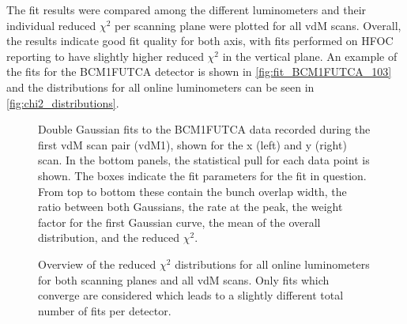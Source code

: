 The fit results were compared among the different luminometers and their individual reduced $\chi^2$ per scanning plane were plotted for all vdM scans. Overall, the results indicate good fit quality for both axis, with fits performed on HFOC reporting to have slightly higher reduced $\chi^2$ in the vertical plane. An example of the fits for the BCM1FUTCA detector is shown in \autoref{fig:fit_BCM1FUTCA_103} and the distributions for all online luminometers can be seen in \autoref{fig:chi2_distributions}.

\begin{figure}[!htb]
	\centering
	\caption[Double Gaussian fits for BCM1FUTCA]{Double Gaussian fits to the BCM1FUTCA data recorded during the first vdM scan pair (vdM1), shown for the x (left) and y (right) scan. In the bottom panels, the statistical pull for each data point is shown. The boxes indicate the fit parameters for the fit in question. From top to bottom these contain the bunch overlap width, the ratio between both Gaussians, the rate at the peak, the weight factor for the first Gaussian curve, the mean of the overall distribution, and the reduced $\chi^2$.}
	\label{fig:fit_BCM1FUTCA_103}
\end{figure}

\begin{figure}[!htb]
	\centering
	\caption[Scan fits reduced $\chi^2$ distribution]{Overview of the reduced $\chi^2$ distributions for all online luminometers for both scanning planes and all vdM scans. Only fits which converge are considered which leads to a slightly different total number of fits per detector.}
	\label{fig:chi2_distributions}
\end{figure}

